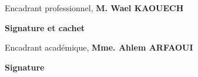 \thispagestyle{empty}

\begin{center}
    \begin{minipage}[l]{1\columnwidth}
        \begin{tcolorbox}[colback=white,boxrule=5pt,arc=10pt,height=105mm]{
            \vspace{2cm}
            \large \@proSignSentence
            \vspace{1mm}
            \begin{center}
                \Large
                Encadrant professionnel, \textbf{M. Wael KAOUECH}
            \end{center}
            \vspace{5mm}
            \hspace{0.71\columnwidth}\textbf{\large Signature et cachet}
        }
        \end{tcolorbox}
    \end{minipage}
    
    \vspace{2cm}
    
    \begin{minipage}[l]{1\columnwidth}
        \begin{tcolorbox}[colback=white,boxrule=5pt,arc=10pt,height=105mm]{
            \vspace{2cm}
            \large \@academicSignSentence
            \vspace{1mm}
            \begin{center}
                \Large
                Encadrant académique, \textbf{Mme. Ahlem ARFAOUI}
            \end{center}
            \vspace{5mm}
            \hspace{0.84\columnwidth}\textbf{\large Signature}
        }
        \end{tcolorbox}
    \end{minipage}
\end{center}